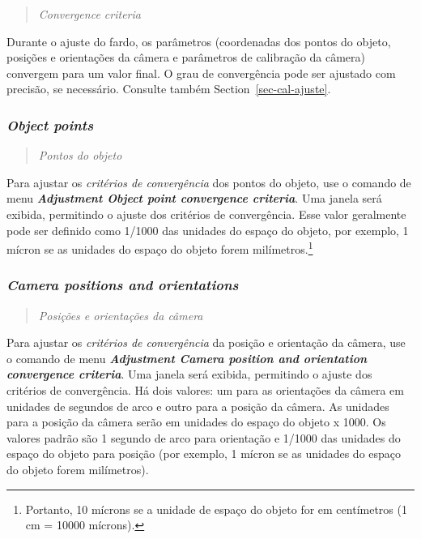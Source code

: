 \documentclass[
  12pt,
  letterpaper,
  DIV=11,
  numbers=noendperiod]{scrreprt}
\begin{document}
\begin{quote}
\emph{Convergence criteria}
\end{quote}

Durante o ajuste do fardo, os parâmetros (coordenadas dos pontos do
objeto, posições e orientações da câmera e parâmetros de calibração da
câmera) convergem para um valor final. O grau de convergência pode ser
ajustado com precisão, se necessário. Consulte também
Section~\ref{sec-cal-ajuste}.

\subsubsection{\texorpdfstring{\emph{Object
points}}{Object points}}\label{object-points-1}

\begin{quote}
\emph{Pontos do objeto}
\end{quote}

Para ajustar os \emph{critérios de convergência} dos pontos do objeto,
use o comando de menu \textbf{\emph{Adjustment \textbar{} Object point
convergence criteria}}. Uma janela será exibida, permitindo o ajuste dos
critérios de convergência. Esse valor geralmente pode ser definido como
1/1000 das unidades do espaço do objeto, por exemplo, 1 mícron se as
unidades do espaço do objeto forem milímetros.\footnote{Portanto, 10
  mícrons se a unidade de espaço do objeto for em centímetros (1 cm =
  10000 mícrons).}

\subsubsection{\texorpdfstring{\emph{Camera positions and
orientations}}{Camera positions and orientations}}\label{camera-positions-and-orientations-1}

\begin{quote}
\emph{Posições e orientações da câmera}
\end{quote}

Para ajustar os \emph{critérios de convergência} da posição e orientação
da câmera, use o comando de menu \textbf{\emph{Adjustment \textbar{}
Camera position and orientation convergence criteria}}. Uma janela será
exibida, permitindo o ajuste dos critérios de convergência. Há dois
valores: um para as orientações da câmera em unidades de segundos de
arco e outro para a posição da câmera. As unidades para a posição da
câmera serão em unidades do espaço do objeto x 1000. Os valores padrão
são 1 segundo de arco para orientação e 1/1000 das unidades do espaço do
objeto para posição (por exemplo, 1 mícron se as unidades do espaço do
objeto forem milímetros).
\end{document}
